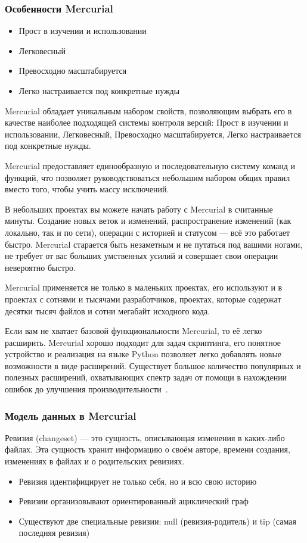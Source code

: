 \documentclass{../industrial-development}
\begin{document}
\begin{frame} \frametitle{Особенности Mercurial}
  
  \begin{itemize}
  \item Прост в изучении и использовании
  \item Легковесный
  \item Превосходно масштабируется
  \item Легко настраивается под конкретные нужды
  \end{itemize}
\end{frame}

\lecturenotes

Mercurial обладает уникальным набором свойств, позволяющим выбрать его в качестве наиболее подходящей системы контроля версий: Прост в изучении и использовании, Легковесный, Превосходно масштабируется, Легко настраивается под конкретные нужды.

Mercurial предоставляет единообразную и последовательную систему команд и функций, что позволяет руководствоваться небольшим набором общих правил вместо того, чтобы учить массу исключений.

В небольших проектах вы можете начать работу с Mercurial в считанные минуты. Создание новых веток и изменений, распространение изменений (как локально, так и по сети), операции с историей и статусом — всё это работает быстро. Mercurial старается быть незаметным и не путаться под вашими ногами, не требует от вас больших умственных усилий и совершает свои операции невероятно быстро.

Mercurial применяется не только в маленьких проектах, его используют и в проектах с сотнями и тысячами разработчиков, проектах, которые содержат десятки тысяч файлов и сотни мегабайт исходного кода.

Если вам не хватает базовой функциональности Mercurial, то её легко расширить. Mercurial хорошо подходит для задач скриптинга, его понятное устройство и реализация на языке Python позволяет легко добавлять новые возможности в виде расширений. Существует большое количество популярных и полезных расширений, охватывающих спектр задач от помощи в нахождении ошибок до улучшения производительности~\cite[с.~6--7]{MercurialOReilly}.

\begin{frame} \frametitle{Модель данных в Mercurial}
  \begin{block}{}
    \alert{Ревизия (changeset)} --- это сущность, описывающая изменения в каких-либо файлах. Эта сущность хранит информацию о своём авторе, времени создания, изменениях в файлах и о родительских ревизиях. 
  \end{block}

  \begin{itemize}
  \item Ревизия идентифицирует не только себя, но и всю свою историю
  \item Ревизии организовывают ориентированный ациклический граф
  \item Существуют две специальные ревизии: null (ревизия-родитель) и tip (самая последняя ревизия)
  \end{itemize}
\end{frame}
\end{document}
